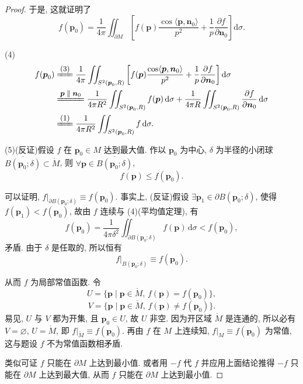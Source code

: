 \begin{proof}
于是, 这就证明了
\[
f(\boldsymbol{p}_{0})=\frac{1}{4\pi}\iint_{\partial M}\left[f(\boldsymbol{p})\frac{\cos\langle\boldsymbol{p},\boldsymbol{n}_{0}\rangle}{p^{2}}+\frac{1}{p}\frac{\partial f}{\partial\boldsymbol{n}_{0}}\right]\mathrm{d}\sigma.
\]

(4)
\[
\begin{aligned}
f(\boldsymbol{p}_{0})&\reason{(3)}\frac{1}{4\pi}\iint_{S^{2}(\boldsymbol{p}_{0},R)}\left[f(\boldsymbol{p})\frac{\cos\langle\boldsymbol{p},\boldsymbol{n}_{0}\rangle}{p^{2}}+\frac{1}{p}\frac{\partial f}{\partial\boldsymbol{n}_{0}}\right]\mathrm{d}\sigma\\
&\reason{$\boldsymbol{p}\parallel\boldsymbol{n}_{0}$}\frac{1}{4\pi R^{2}}\iint_{S^{2}(\boldsymbol{p}_{0},R)}f(\boldsymbol{p})\,\mathrm{d}\sigma+\frac{1}{4\pi R}\iint_{S^{2}(\boldsymbol{p}_{0},R)}\frac{\partial f}{\partial\boldsymbol{n}_{0}}\,\mathrm{d}\sigma\\
&\reason{(1)}\frac{1}{4\pi R^{2}}\iint_{S^{2}(\boldsymbol{p}_{0},R)}f\,\mathrm{d}\sigma.
\end{aligned}
\]

(5)(反证)假设 $f$ 在 $\boldsymbol{p}_{0}\in M$ 达到最大值. 作以 $\boldsymbol{p}_{0}$ 为中心, $\delta$ 为半径的小闭球 $\overline{B(\boldsymbol{p}_{0};\delta)}\subset\mathring{M}$, 则 $\forall\boldsymbol{p}\in\overline{B(\boldsymbol{p}_{0};\delta)}$,
\[
f(\boldsymbol{p})\leqslant f(\boldsymbol{p}_{0}).
\]

可以证明, $f|_{\partial B(\boldsymbol{p}_{0};\delta)}\equiv f(\boldsymbol{p}_{0})$. 事实上, (反证)假设 $\exists\boldsymbol{p}_{1}\in\partial B(\boldsymbol{p}_{0};\delta)$, 使得 $f(\boldsymbol{p}_{1})<f(\boldsymbol{p}_{0})$, 故由 $f$ 连续与 (4)(平均值定理), 有
\[
f(\boldsymbol{p}_{0})=\frac{1}{4\pi\delta^{2}}\iint_{\partial B(\boldsymbol{p}_{0};\delta)}f(\boldsymbol{p})\,\mathrm{d}\sigma<f(\boldsymbol{p}_{0}),
\]
矛盾. 由于 $\delta$ 是任取的, 所以恒有
\[
f|_{B(\boldsymbol{p}_{0};\delta)}\equiv f(\boldsymbol{p}_{0}).
\]

从而 $f$ 为局部常值函数. 令
\[
U=\{\boldsymbol{p}\mid\boldsymbol{p}\in\mathring{M},\,f(\boldsymbol{p})=f(\boldsymbol{p}_{0})\},
\]
\[
V=\{\boldsymbol{p}\mid\boldsymbol{p}\in\mathring{M},\,f(\boldsymbol{p})\neq f(\boldsymbol{p}_{0})\}.
\]
易见, $U$ 与 $V$ 都为开集, 且 $\boldsymbol{p}_{0}\in U$, 故 $U$ 非空. 因为开区域 $\mathring{M}$ 是连通的, 所以必有 $V=\varnothing$, $U=\mathring{M}$, 即 $f|_{\mathring{M}}\equiv f(\boldsymbol{p}_{0})$. 再由 $f$ 在 $M$ 上连续知, $f|_{M}\equiv f(\boldsymbol{p}_{0})$ 为常值, 这与题设 $f$ 不为常值函数相矛盾.

类似可证 $f$ 只能在 $\partial M$ 上达到最小值. 或者用 $-f$ 代 $f$ 并应用上面结论推得 $-f$ 只能在 $\partial M$ 上达到最大值, 从而 $f$ 只能在 $\partial M$ 上达到最小值.
\end{proof}

